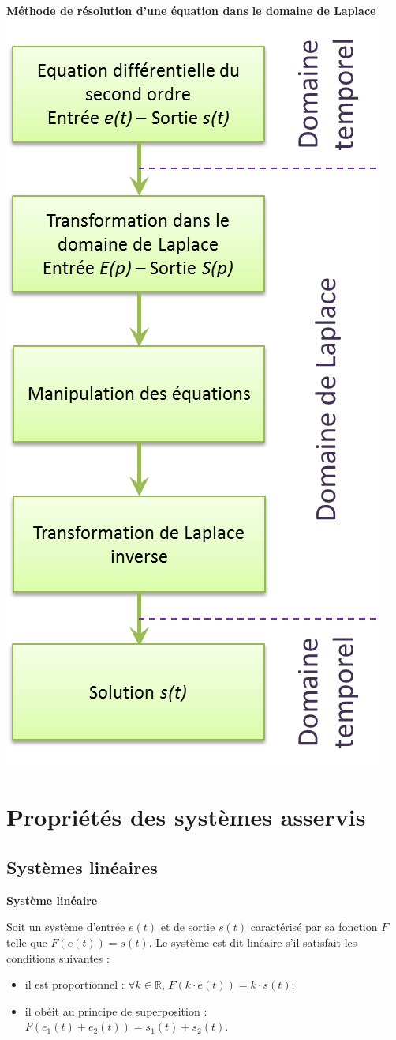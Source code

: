\documentclass[10pt,fleqn]{article} %
\begin{document}
\begin{minipage}[c]{.45\linewidth}
\begin{center}
\textbf{Méthode de résolution d'une équation dans le domaine de Laplace}
\includegraphics[width=.7\textwidth]{images/laplace}
\end{center}
\end{minipage} \hfill

\section{Propriétés des systèmes asservis}
\subsection{Systèmes linéaires}
\begin{defi}
\textbf{Système linéaire}

Soit un système d'entrée $e(t)$ et de sortie $s(t)$ caractérisé par sa fonction $F$ telle que $F(e(t))=s(t)$. Le système est dit linéaire s'il satisfait les conditions suivantes : 
\begin{itemize}
\item il est proportionnel : $\forall k \in \mathbb{R}$, $F(k\cdot e(t))=k\cdot s(t)$;
\item il obéit au principe de superposition : $F(e_1(t)+e_2(t))=s_1(t)+s_2(t)$.
\end{itemize}
\end{defi}
\end{document}
